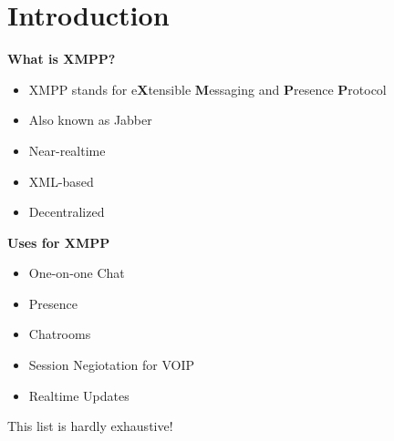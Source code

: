 \part{Introduction}

\newpage
\begin{center}
{\huge \bfseries What is XMPP?}
\end{center}
\pause

\begin{itemize}
\item XMPP stands for e\textbf{X}tensible \textbf{M}essaging and \textbf{P}resence \textbf{P}rotocol
\pause
\item Also known as Jabber
\pause
\item Near-realtime
\pause
\item XML-based
\pause
\item Decentralized
\end{itemize}

\newpage
\begin{center}
{\huge \bfseries Uses for XMPP}
\end{center}
\pause

\begin{itemize}
\item One-on-one Chat
\pause
\item Presence
\pause
\item Chatrooms
\pause
\item Session Negiotation for VOIP
\pause
\item Realtime Updates
\end{itemize}

\pause
\vfill
\begin{center}
This list is hardly exhaustive!
\end{center}
